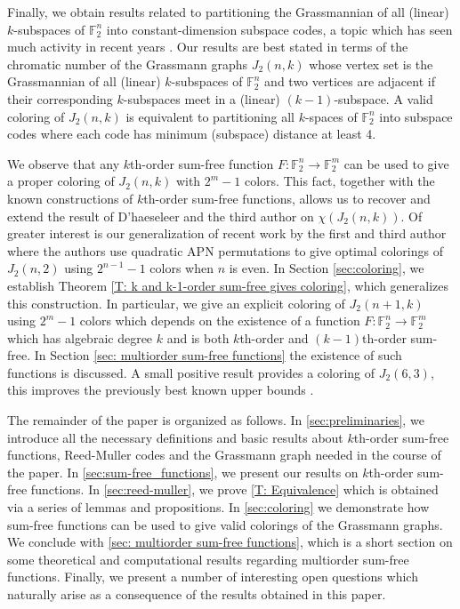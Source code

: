 \documentclass[12pt]{article}
\theoremstyle{definition}
\newcommand{\F}{\mathbb F}
\newcounter{numb}
\begin{document}
Finally, we obtain results related to partitioning the Grassmannian of all (linear) $k$-subspaces of $\F_2^n$ into constant-dimension subspace codes, a topic which has seen much activity in recent years \cite{dhaeseleer2026chromaticnumbergrassmanngraphs, dhaeseleer2025chromaticnumbergrassmanngraphs, Etzion2015PartialKParallelisms, EtzionSilberstein2009Ferrers, heering2025lineparallelismspgn2preparatalike, KoetterKschischang2008, SilbersteinEtzion2011Lexicodes}. Our results are best stated in terms of the chromatic number of the Grassmann graphs $J_2(n, k)$ whose vertex set is the Grassmannian of all (linear) $k$-subspaces of $\F_2^n$ and two vertices are adjacent if their corresponding $k$-subspaces meet in a (linear) $(k-1)$-subspace. A valid coloring of $J_2(n, k)$ is equivalent to partitioning all $k$-spaces of $\F_2^n$ into subspace codes where each code has minimum (subspace) distance at least 4.

We observe that any $k$th-order sum-free function $F\colon \F_2^n \rightarrow \F_2^m$ can be used to give a proper coloring of $J_2(n, k)$ with $2^m - 1$ colors. This fact, together with the known constructions of $k$th-order sum-free functions, allows us to recover and extend the result of D'haeseleer and the third author \cite{dhaeseleer2025chromaticnumbergrassmanngraphs} on $\chi(J_2(n, k))$.  Of greater interest is our generalization of recent work by the first and third author \cite{heering2025lineparallelismspgn2preparatalike} where the authors use quadratic APN permutations to give optimal colorings of $J_2(n, 2)$ using $2^{n-1}-1$ colors when $n$ is even. In Section \ref{sec:coloring}, we establish Theorem \ref{T: k and k-1-order sum-free gives coloring}, which generalizes this construction. In particular, we give an explicit coloring of $J_2(n+1, k)$ using $2^m - 1$ colors which depends on the existence of a function $F:\F_2^n \rightarrow \F_2^m$ which has algebraic degree $k$ and is both $k$th-order and $(k-1)$th-order sum-free. In Section \ref{sec: multiorder sum-free functions} the existence of such functions is discussed. A small positive result provides a coloring of $J_2(6,3)$, this improves the previously best known upper bounds \cite{dhaeseleer2026chromaticnumbergrassmanngraphs, dhaeseleer2025chromaticnumbergrassmanngraphs}. 

The remainder of the paper is organized as follows. In \cref{sec:preliminaries}, we introduce all the necessary definitions and basic results about $k$th-order sum-free functions, Reed-Muller codes and the Grassmann graph needed in the course of the paper. In \cref{sec:sum-free_functions}, we present our results on $k$th-order sum-free functions. In \cref{sec:reed-muller}, we prove \cref{T: Equivalence} which is obtained via a series of lemmas and propositions. 
In \cref{sec:coloring} we demonstrate how sum-free functions can be used to give valid colorings of the Grassmann graphs.
We conclude with \cref{sec: multiorder sum-free functions}, which is a short section on some theoretical and computational results regarding multiorder sum-free functions. Finally, we present a number of interesting open questions which naturally arise as a consequence of the results obtained in this paper.
\end{document}
